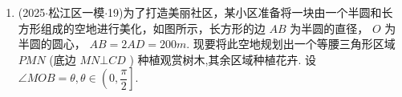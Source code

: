 \begin{enumerate}
\begin{jieda}
\begin{enumerate}
            方案二: 设 $\angle {COD} = \theta ,\theta  \in  \left( {0,\dfrac{5\pi }{6}}\right) ,\bigtriangleup {COD}$ 中,由正弦定理得 $\dfrac{OC}{\sin \dfrac{\pi }{6}} = \dfrac{OD}{\sin \left( {\dfrac{5\pi }{6} - \theta }\right) } = \dfrac{CD}{\sin \theta }$ ,得 ${OD} = {60}\sin \left( {\dfrac{5\pi }{6} - \theta }\right) ,{CD} =  {60}\sin \theta ,\theta  \in  \left( {0,\dfrac{5\pi }{6}}\right)$ ,故 $\bigtriangleup  {COD}$ 的周长 $L = {60}\sin \theta  + {60}\sin \left( {\dfrac{5\pi }{6} - }\right.  \theta ) + {30} = \left( {{60} + {30}\sqrt{3}}\right) \sin \theta  + {30}\cos \theta  + {30} = {60}\sqrt{2 + \sqrt{3}}\sin (\theta  +  \left. \dfrac{\pi }{12}\right)  + {30}$ ,因为 $\theta  \in  \left( {0,\dfrac{5\pi }{6}}\right)$ ,所以 $\theta  + \dfrac{\pi }{12} \in  \left( {\dfrac{\pi }{12},\dfrac{11\pi }{12}}\right)$ ,当 $\theta  +  \dfrac{\pi }{12} = \dfrac{\pi }{2}$ ,即 $\theta  = \dfrac{5\pi }{12}$ 时有 ${L}_{\max } = {60}\sqrt{2 + \sqrt{3}} + {30} = {30}\sqrt{6} +  {30}\sqrt{2} + {30}$ 米,因此,当亲水平台区的周长最长时, $\bigtriangleup {COD}$ 是以 ${OC}$ 为底边的等腰三角形.
        \end{enumerate}
    \end{jieda}


    \item (2025$\cdot$松江区一模$\cdot$19)为了打造美丽社区，某小区准备将一块由一个半圆和长方形组成的空地进行美化，如图所示，长方形的边 ${AB}$ 为半圆的直径， $O$ 为半圆的圆心， ${AB} = {2AD} = {200}{m}$. 现要将此空地规划出一个等腰三角形区域 ${PMN}$ (底边 ${MN} \bot  {CD}$ ) 种植观赏树木,其余区域种植花卉. 设 $\angle {MOB} = \theta ,\theta  \in  \left( {0,\dfrac{\pi }{2}}\right\rbrack$.


\end{enumerate}
